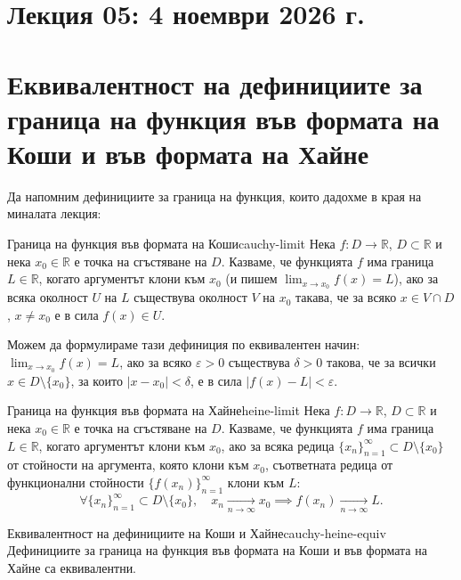 \section*{Лекция 05: 4 ноември 2026 г.}

\section{Еквивалентност на дефинициите за граница на функция във формата на Коши и във формата на Хайне}

Да напомним дефинициите за граница на функция, които дадохме в края на миналата лекция:

\begin{definition}{Граница на функция във формата на Коши}{cauchy-limit}
Нека $f : D \to \mathbb{R}$, $D \subset \mathbb{R}$ и нека $x_0 \in \mathbb{R}$ е точка на сгъстяване на $D$. Казваме, че функцията $f$ има граница $L \in \mathbb{R}$, когато аргументът клони към $x_0$ (и пишем $\lim_{x \to x_0} f(x) = L$), ако за всяка околност $U$ на $L$ съществува околност $V$ на $x_0$ такава, че за всяко $x \in V \cap D$, $x \neq x_0$ е в сила $f(x) \in U$.

Можем да формулираме тази дефиниция по еквивалентен начин: $\lim_{x \to x_0} f(x) = L$, ако за всяко $\varepsilon > 0$ съществува $\delta > 0$ такова, че за всички $x \in D \setminus \{x_0\}$, за които $|x - x_0| < \delta$, е в сила $|f(x) - L| < \varepsilon$.
\end{definition}

\begin{definition}{Граница на функция във формата на Хайне}{heine-limit}
Нека $f : D \to \mathbb{R}$, $D \subset \mathbb{R}$ и нека $x_0 \in \mathbb{R}$ е точка на сгъстяване на $D$. Казваме, че функцията $f$ има граница $L \in \mathbb{R}$, когато аргументът клони към $x_0$, ако за всяка редица $\{x_n\}_{n=1}^{\infty} \subset D \setminus \{x_0\}$ от стойности на аргумента, която клони към $x_0$, съответната редица от функционални стойности $\{f(x_n)\}_{n=1}^{\infty}$ клони към $L$:
\[
\forall \{x_n\}_{n=1}^{\infty} \subset D \setminus \{x_0\}, \quad x_n \xrightarrow[n \to \infty]{} x_0 \implies f(x_n) \xrightarrow[n \to \infty]{} L.
\]
\end{definition}

\begin{theorem}{Еквивалентност на дефинициите на Коши и Хайне}{cauchy-heine-equiv}
Дефинициите за граница на функция във формата на Коши и във формата на Хайне са еквивалентни.
\end{theorem}

